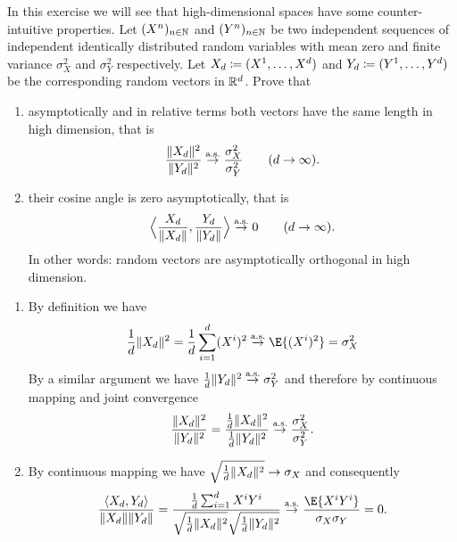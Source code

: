 
\begin{exercise}[subtitle={Random vectors in high dimension \Coffeecup}]
    In this exercise we will see that high-dimensional spaces have some counter-intuitive
    properties. Let \((X^n)_{n\in \nat}\) and \((Y^n)_{n\in \nat}\) be two independent
    sequences of independent identically distributed random variables with mean
    zero and finite variance \(\sigma_X^2\) and \(\sigma_Y^2\) respectively. Let \(X_\dims \coloneq (X^1, \ldots, X^\dims)\)
    and \(Y_\dims \coloneq (Y^1, \ldots, Y^\dims)\) be the corresponding random vectors in
    \(\real^\dims\).
    Prove that
    \begin{enumerate}[label=(\alph*), noitemsep]
        \item\label{it: (random vectors in high dim) norms}
        asymptotically and in relative terms both vectors have the same
        length in high dimension, that is
        \[
            \frac{\norm{X_\dims}^2}{\norm{Y_\dims}^2} \overset\as\to \frac{\sigma_X^2}{\sigma_Y^2} \qquad (\dims \to \infty).
        \]
        \item\label{it: (random vectors in high dim) angle} their cosine angle is zero asymptotically, that is
        \[
            \scp[\Big]{\frac{X_\dims}{\norm{X_\dims}}, \frac{Y_\dims}{\norm{Y_\dims}}} \overset\as\to 0 \qquad (\dims \to \infty).
        \]
        In other words: random vectors are asymptotically orthogonal in high dimension.
    \end{enumerate}
\end{exercise}

\begin{solution}
\begin{enumerate}[wide=0pt]
    \item[\ref{it: (random vectors in high dim) norms}]
    By definition we have
    \[
        \frac1\dims\norm{X_\dims}^2
        = \frac1\dims \sum_{i=1}^\dims (X^i)^2
        \overset{\as}\to \E{(X^i)^2}
        = \sigma_X^2
    \]
    By a similar argument we have \(\frac1\dims\norm{Y_\dims}^2\overset{\as}\to \sigma_Y^2\)
    and therefore by continuous mapping and joint convergence
    \[
        \frac{\norm{X_\dims}^2}{\norm{Y_\dims}^2}
        = \frac{\frac1\dims\norm{X_\dims}^2}{\frac1\dims\norm{Y_\dims}^2}
        \overset{\as}\to \frac{\sigma_X^2}{\sigma_Y^2}.
    \]
    \item[\ref{it: (random vectors in high dim) angle}]
    By continuous mapping we have \(\sqrt{\frac1\dims \norm{X_\dims}^2} \to \sigma_X\)
    and consequently
    \[
        \frac{\scp{X_\dims, Y_\dims}}{\norm{X_\dims} \norm{Y_\dims}}
        = \frac{\frac1\dims \sum_{i=1}^\dims X^i Y^i}{\sqrt{\frac1\dims \norm{X_\dims}^2} \sqrt{\frac1\dims \norm{Y_\dims}^2}}
        \overset{\as}\to \frac{\E{X^i Y^i}}{\sigma_X\sigma_Y}
        = 0.
    \]
\end{enumerate}
\end{solution}
